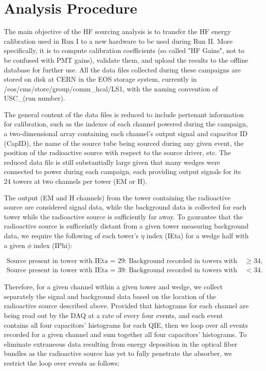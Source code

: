 \section{Analysis Procedure}
The main objective of the HF sourcing analysis is to transfer the HF energy
calibration used in Run I to a new hardware to be used during Run II. More
specifically, it is to compute calibration coefficients (so called "HF
Gains", not to be confused with PMT gains), validate them, and upload the
results to the offline database for further use. All the data files
collected during these campaigns are stored on disk at CERN in the EOS
storage system, currently in /eos/cms/store/group/comm\_hcal/LS1, with the
naming convention of USC\_(run number).

The general content of the data files is reduced to include pertenant
information for calibration, such as the indexes of each channel powered
during the campaign, a two-dimensional array containing each channel's
output signal and capacitor ID (CapID), the name of the source tube being
sourced during any given event, the position of the radioactive source
with respect to the source driver, etc. The reduced data file is still
substantially large given that many wedges were connected to power during
each campaign, each providing output signals for its 24 towers at two
channels per tower (EM or H).

The output (EM and H channels) from the tower containing the
radioactive source are considered signal data, while the background data
is collected for each tower while the radioactive source is sufficiently
far away. To gaurantee that the radioactive source is sufficeintly distant
from a given tower measuring background data, we require the following of
each tower's $\eta$ index (IEta) for a wedge half with a given $\phi$
index (IPhi):

\begin{center}
   \begin{eqnarray}
      \label{eq:Tower_Cuts}
      \textrm{Source present in tower with IEta = 29: Background recorded in towers with IEta $\ge$ 34,} \\
      \textrm{Source present in tower with IEta = 39: Background recorded in towers with IEta $<$ 34.} \nonumber
   \end{eqnarray}
\end{center}

Therefore, for a given channel within a given tower and wedge, we collect
separately the signal and background data based on the location of the
radioactive source described above. Provided that histograms for each channel
are being read out by the DAQ at a rate of every four events, and each event
contains all four capacitors' histograms for each QIE, then we loop over all
events recorded for a given channel and sum together all four capacitors'
histograms. To eliminate extraneous data resulting from energy deposition
in the optical fiber bundles as the radioactive source has yet to fully
penetrate the absorber, we restrict the loop over events as follows:

